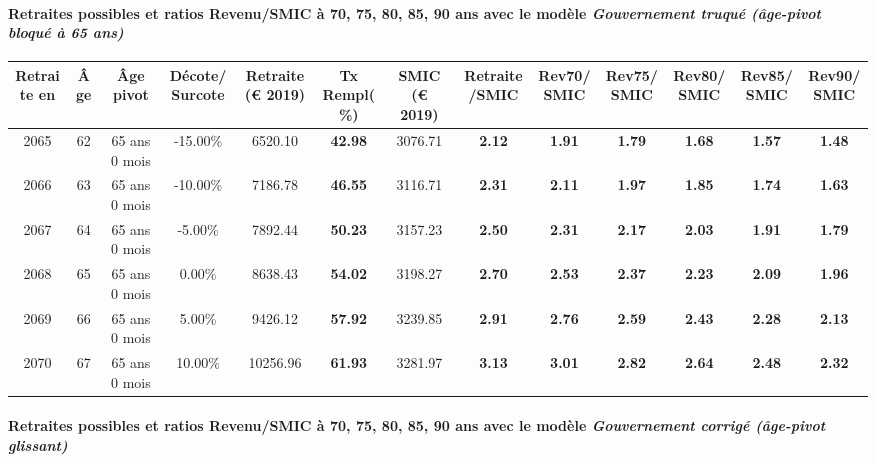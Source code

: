 \paragraph{Retraites possibles et ratios Revenu/SMIC à 70, 75, 80, 85, 90 ans avec le modèle \emph{Gouvernement truqué (âge-pivot bloqué à 65 ans)}}  
 
{ \scriptsize \begin{center} 
\begin{tabular}[htb]{|c|c||c|c||c|c||c||c|c|c|c|c|c|} 
\hline 
 Retraite en &  Âge &  Âge pivot &  Décote/Surcote &  Retraite (\euro{} 2019) &  Tx Rempl(\%) &  SMIC (\euro{} 2019) &  Retraite/SMIC &  Rev70/SMIC &  Rev75/SMIC &  Rev80/SMIC &  Rev85/SMIC &  Rev90/SMIC \\ 
\hline \hline 
 2065 &  62 &  65 ans 0 mois &  -15.00\% &  6520.10 &  {\bf 42.98} &  3076.71 &  {\bf 2.12} &  {\bf 1.91} &  {\bf 1.79} &  {\bf 1.68} &  {\bf 1.57} &  {\bf 1.48} \\ 
\hline 
 2066 &  63 &  65 ans 0 mois &  -10.00\% &  7186.78 &  {\bf 46.55} &  3116.71 &  {\bf 2.31} &  {\bf 2.11} &  {\bf 1.97} &  {\bf 1.85} &  {\bf 1.74} &  {\bf 1.63} \\ 
\hline 
 2067 &  64 &  65 ans 0 mois &  -5.00\% &  7892.44 &  {\bf 50.23} &  3157.23 &  {\bf 2.50} &  {\bf 2.31} &  {\bf 2.17} &  {\bf 2.03} &  {\bf 1.91} &  {\bf 1.79} \\ 
\hline 
 2068 &  65 &  65 ans 0 mois &  0.00\% &  8638.43 &  {\bf 54.02} &  3198.27 &  {\bf 2.70} &  {\bf 2.53} &  {\bf 2.37} &  {\bf 2.23} &  {\bf 2.09} &  {\bf 1.96} \\ 
\hline 
 2069 &  66 &  65 ans 0 mois &  5.00\% &  9426.12 &  {\bf 57.92} &  3239.85 &  {\bf 2.91} &  {\bf 2.76} &  {\bf 2.59} &  {\bf 2.43} &  {\bf 2.28} &  {\bf 2.13} \\ 
\hline 
 2070 &  67 &  65 ans 0 mois &  10.00\% &  10256.96 &  {\bf 61.93} &  3281.97 &  {\bf 3.13} &  {\bf 3.01} &  {\bf 2.82} &  {\bf 2.64} &  {\bf 2.48} &  {\bf 2.32} \\ 
\hline 
\hline 
\end{tabular} 
\end{center} } 
\paragraph{Retraites possibles et ratios Revenu/SMIC à 70, 75, 80, 85, 90 ans avec le modèle \emph{Gouvernement corrigé (âge-pivot glissant)}}  
 
